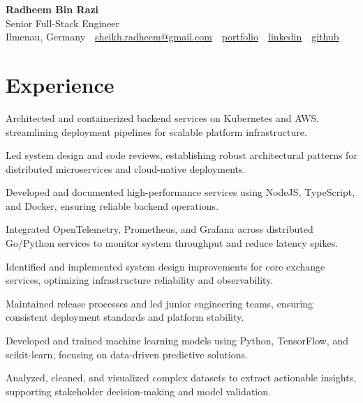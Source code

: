 \documentclass[10pt,a4paper]{resume}
\makeatletter
\newcommand{\Portfolio}{https://radheem.github.io/my-cv}
\newcommand{\PortfolioText}{portfolio}
\newcommand{\GitHub}{https://github.com/radheem}
\newcommand{\LinkedIn}{https://www.linkedin.com/in/radheem-razi}
\newcommand{\Email}{sheikh.radheem@gmail.com}
\makeatother
\begin{document}
\begin{center}
  {\huge\bfseries Radheem Bin Razi}\\[3pt]
  {\large Senior Full-Stack Engineer}\\[6pt]
  \small
  Ilmenau, Germany \,\textbar\,
  \href{mailto:\Email}{\Email} \,\textbar\,
  \href{\Portfolio}{\PortfolioText} \,\textbar\,
  \href{\LinkedIn}{linkedin} \,\textbar\,
  \href{\GitHub}{github}
\end{center}
\vspace{2pt}

\section{Experience}

\bullets
  \item Architected and containerized backend services on Kubernetes and AWS, streamlining deployment pipelines for scalable platform infrastructure.
  \item Led system design and code reviews, establishing robust architectural patterns for distributed microservices and cloud-native deployments.
  \item Developed and documented high-performance services using NodeJS, TypeScript, and Docker, ensuring reliable backend operations.
\bulletsend
\vspace{1.5pt}
\bullets
  \item Integrated OpenTelemetry, Prometheus, and Grafana across distributed Go/Python services to monitor system throughput and reduce latency spikes.
  \item Identified and implemented system design improvements for core exchange services, optimizing infrastructure reliability and observability.
  \item Maintained release processes and led junior engineering teams, ensuring consistent deployment standards and platform stability.
\bulletsend
\vspace{1.5pt}
\bullets
  \item Developed and trained machine learning models using Python, TensorFlow, and scikit-learn, focusing on data-driven predictive solutions.
  \item Analyzed, cleaned, and visualized complex datasets to extract actionable insights, supporting stakeholder decision-making and model validation.
\bulletsend
\vspace{1.5pt}
\end{document}
